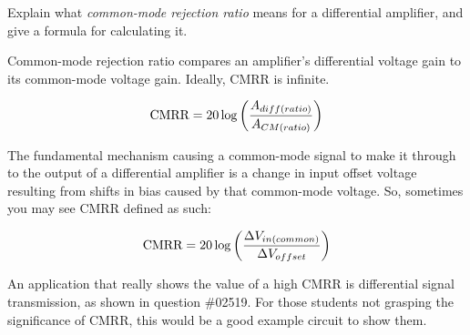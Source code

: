 

Explain what {\it common-mode rejection ratio} means for a differential amplifier, and give a formula for calculating it.







Common-mode rejection ratio compares an amplifier's differential voltage gain to its common-mode voltage gain.  Ideally, CMRR is infinite.

$$\hbox{CMRR} = 20 \log \left( {A_{diff(ratio)} \over A_{CM(ratio)}} \right)$$

The fundamental mechanism causing a common-mode signal to make it through to the output of a differential amplifier is a change in input offset voltage resulting from shifts in bias caused by that common-mode voltage.  So, sometimes you may see CMRR defined as such:

$$\hbox{CMRR} = 20 \log \left( {\Delta V_{in(common)} \over \Delta V_{offset}} \right)$$







An application that really shows the value of a high CMRR is differential signal transmission, as shown in question \#02519.  For those students not grasping the significance of CMRR, this would be a good example circuit to show them.




